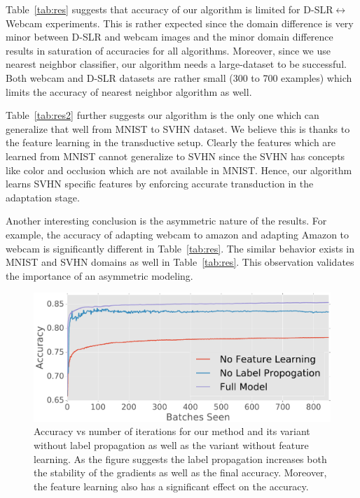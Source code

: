 Table~\ref{tab:res} suggests that accuracy of our algorithm is limited  for D-SLR$\leftrightarrow$Webcam experiments. This is rather expected since the domain difference is very minor between D-SLR and webcam images and the minor domain difference results in saturation of accuracies for all algorithms. Moreover, since we use nearest neighbor classifier, our algorithm needs a large-dataset to be successful. Both webcam and D-SLR datasets are rather small (300 to 700 examples) which limits the accuracy of nearest neighbor algorithm as well.

Table~\ref{tab:res2} further suggests our algorithm is the only one which can generalize that well from MNIST to SVHN dataset. We believe this is thanks to the feature learning in the transductive setup. Clearly the features which are learned from MNIST cannot generalize to SVHN since the SVHN has concepts like color and occlusion which are not available in MNIST. Hence, our algorithm learns SVHN specific features by enforcing accurate transduction in the adaptation stage.

Another interesting conclusion is the asymmetric nature of the results. For example, the accuracy of adapting webcam to amazon and adapting Amazon to webcam is significantly different in Table~\ref{tab:res}. The similar behavior exists in MNIST and SVHN domains as well in Table~\ref{tab:res}. This observation validates the importance of an asymmetric modeling.

\begin{figure}[ht]
\vspace{-1mm}
\includegraphics[width=\columnwidth]{no_feature_propogation}
\vspace{-6mm}
\caption{Accuracy vs number of iterations for our method and its variant without label propagation as well as the variant without feature learning. As the figure suggests the label propagation increases both the stability of the gradients as well as the final accuracy. Moreover, the feature learning also has a significant effect on the accuracy.}
\label{fllprop}
\end{figure}

